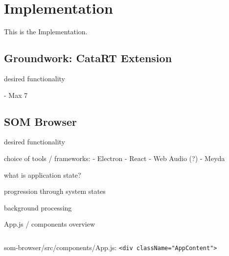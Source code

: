 
\section{Implementation}
\label{sec:implementation}
This is the Implementation.

\subsection{Groundwork: CataRT Extension}
\label{subsec:implementation_catart}

desired functionality

- Max 7

\subsection{SOM Browser}
\label{subsec:implementation_som_browser}

desired functionality

choice of tools / frameworks:
- Electron
- React
- Web Audio (?)
- Meyda

what is application state?

progression through system states

background processing

App.js / components overview

\begin{listing}[!htb]
  \begin{mdframed}
    \inputminted[numbers=left, firstline=400, lastline=460,
    fontsize=\scriptsize]{jsx}{../dev/som-browser/src/components/App.js}
  \end{mdframed}
  \caption{som-browser/src/components/App.js: \texttt{<div className="AppContent">}}
  \label{lst:som-browser_app_content}
\end{listing}
